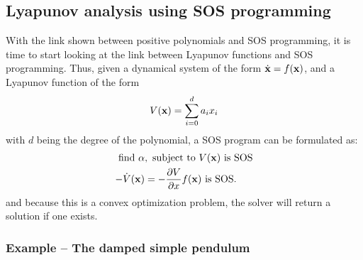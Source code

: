 \subsection{Lyapunov analysis using SOS programming}

With the link shown between positive polynomials and \ac{SOS} programming, it is
time to start looking at the link between Lyapunov functions and SOS
programming. Thus, given a dynamical system of the form \(\dot{\mathbf{x}} =
f(\mathbf{x})\), and a Lyapunov function of the form
\[
  V(\mathbf{x}) = \sum_{i=0}^{d} a_{i}x_{i}
\]
with \(d\) being the degree of the polynomial, a \ac{SOS} program can be
formulated as:
\begin{align*}
  \text{find \(\alpha\)}&, \text{ subject to } V(\mathbf{x}) \text{ is SOS}\\
  -\dot{V}(\mathbf{x}) &= -\frac{\partial V}{\partial x}f(\mathbf{x}) \text{ is SOS}.\\
\end{align*}
and because this is a convex optimization problem, the solver will return a
solution if one exists.

\subsubsection{Example -- The damped simple pendulum}

